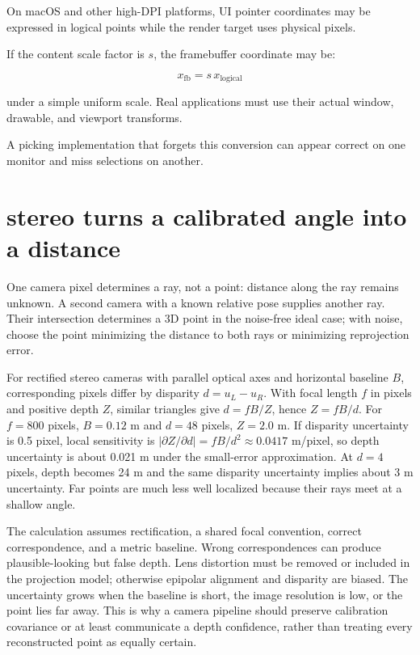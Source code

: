 On macOS and other high-DPI platforms, UI pointer coordinates may be expressed in logical points while the render target uses physical pixels.

If the content scale factor is \(s\), the framebuffer coordinate may be:

\[ x_{\mathrm{fb}}=s\,x_{\mathrm{logical}} \]

under a simple uniform scale. Real applications must use their actual window, drawable, and viewport transforms.

A picking implementation that forgets this conversion can appear correct on one monitor and miss selections on another.

\section{stereo turns a calibrated angle into a distance}\label{02-foundations-ii-ch035-stereo-turns-a-calibrated-angle-into-a-distance}

One camera pixel determines a ray, not a point: distance along the ray remains unknown. A second camera with a known relative pose supplies another ray. Their intersection determines a 3D point in the noise-free ideal case; with noise, choose the point minimizing the distance to both rays or minimizing reprojection error.

For rectified stereo cameras with parallel optical axes and horizontal baseline \(B\), corresponding pixels differ by disparity \(d=u_L-u_R\). With focal length \(f\) in pixels and positive depth \(Z\), similar triangles give \(d=fB/Z\), hence \(Z=fB/d\). For \(f=800\) pixels, \(B=0.12\) m and \(d=48\) pixels, \(Z=2.0\) m. If disparity uncertainty is 0.5 pixel, local sensitivity is \(|\partial Z/\partial d|=fB/d^2\approx0.0417\) m/pixel, so depth uncertainty is about 0.021 m under the small-error approximation. At \(d=4\) pixels, depth becomes 24 m and the same disparity uncertainty implies about 3 m uncertainty. Far points are much less well localized because their rays meet at a shallow angle.

The calculation assumes rectification, a shared focal convention, correct correspondence, and a metric baseline. Wrong correspondences can produce plausible-looking but false depth. Lens distortion must be removed or included in the projection model; otherwise epipolar alignment and disparity are biased. The uncertainty grows when the baseline is short, the image resolution is low, or the point lies far away. This is why a camera pipeline should preserve calibration covariance or at least communicate a depth confidence, rather than treating every reconstructed point as equally certain.

